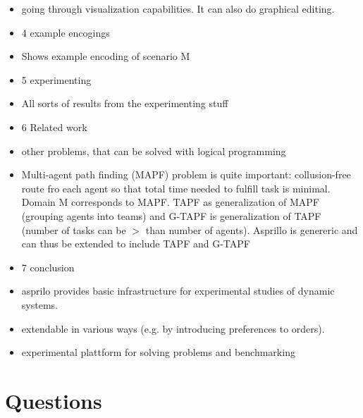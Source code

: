 \documentclass[runningheads]{llncs}
\begin{document}
\begin{itemize}
    \item going through visualization capabilities. It can also do graphical editing. 
    \item 4 example encogings 
    \item Shows example encoding of scenario M
    \item 5 experimenting 
    \item All sorts of results from the experimenting stuff 
    \item 6 Related work
    \item other problems, that can be solved with logical programming
    \item Multi-agent path finding (MAPF) problem is quite important: collusion-free route fro each agent so that total time needed to fulfill task is minimal. Domain M corresponds to MAPF. TAPF as generalization of MAPF (grouping agents into teams) and G-TAPF is generalization of TAPF (number of tasks can be $>$ than number of agents). Asprillo is genereric and can thus be extended to include TAPF and G-TAPF
    \item 7 conclusion
    \item asprilo provides basic infrastructure for experimental studies of dynamic systems. 
    \item extendable in various ways (e.g. by introducing preferences to orders).
    \item experimental plattform for solving problems and benchmarking 
\end{itemize}



\section{Questions}
\end{document}
